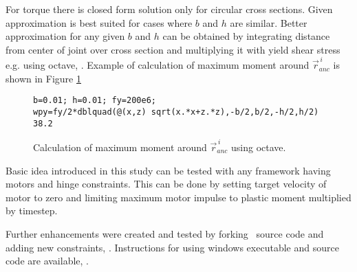 For torque there is closed form solution only for
circular cross sections.
Given approximation is 
best suited for cases where $b$ and $h$ are similar.
Better approximation for any given $b$ and $h$ can be obtained 
by integrating distance from center of joint over cross section and
multiplying it with yield shear stress e.g. using octave, \cite{octave}.
Example of calculation of maximum moment  around $\vec{r}_{anc}^{\,i} $
is shown in Figure \ref{fig:octave-mp}

\begin{figure}[htb!]
\centering
\lstset{language=octave}
\begin{lstlisting}
b=0.01; h=0.01; fy=200e6;
wpy=fy/2*dblquad(@(x,z) sqrt(x.*x+z.*z),-b/2,b/2,-h/2,h/2)
38.2
\end{lstlisting}

\caption{Calculation of maximum moment  around $\vec{r}_{anc}^{\,i} $ using octave.}
\label{fig:octave-mp}
\end{figure}


Basic idea introduced in this study can be tested with any framework having motors and hinge constraints.
This can be done by setting target velocity of motor to zero and limiting maximum motor impulse to plastic moment 
multiplied by timestep.

Further enhancements were created and tested by forking \bullet\ source code
and adding new constraints, \cite{pbullet}.
Instructions for using  windows executable and  source code are available, \cite{bp}.

